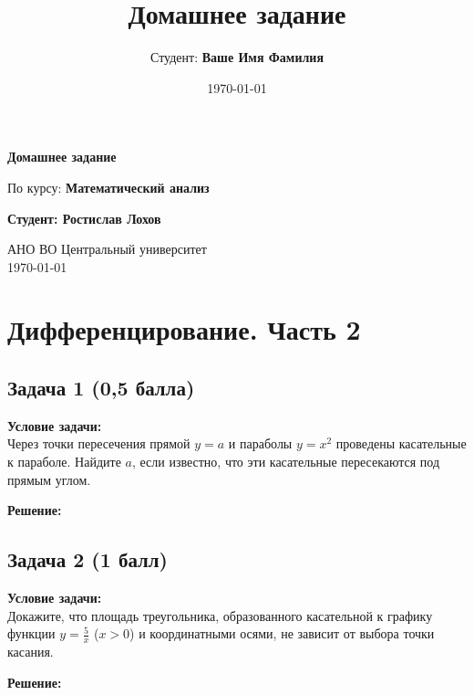 \documentclass[a4paper,12pt]{article}
\title{Домашнее задание}
\author{Студент: \textbf{Ваше Имя Фамилия}}
\date{\today}
\begin{document}
\begin{titlepage}
    \centering
    \vspace*{1cm}

    \Huge
    \textbf{Домашнее задание}

    \vspace{0.5cm}
    \LARGE
    По курсу: \textbf{Математический анализ}

    \vspace{1.5cm}

    \textbf{Студент: Ростислав Лохов}

    \vfill

    \Large
    АНО ВО Центральный университет\\
    \vspace{0.3cm}
    \today
\end{titlepage}

\tableofcontents
\newpage

\section{Дифференцирование. Часть 2}

\subsection{Задача 1 (0,5 балла)}
\textbf{Условие задачи:} \\
Через точки пересечения прямой \( y = a \) и параболы \( y = x^2 \) проведены касательные к параболе. Найдите \( a \), если известно, что эти касательные пересекаются под прямым углом.

\textbf{Решение:} \\

\vspace{1cm}

\subsection{Задача 2 (1 балл)}
\textbf{Условие задачи:} \\
Докажите, что площадь треугольника, образованного касательной к графику функции \( y = \frac{5}{x} \) (\( x > 0 \)) и координатными осями, не зависит от выбора точки касания.

\textbf{Решение:} \\

\vspace{1cm}
\end{document}
